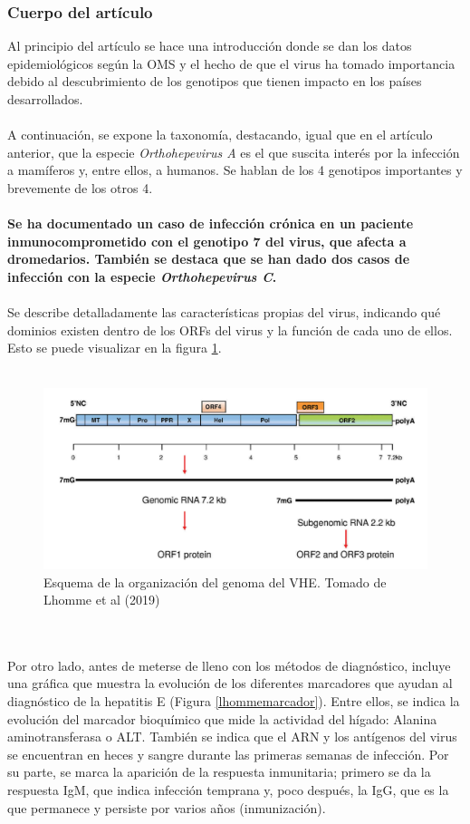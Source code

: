 \documentclass[11 pt]{article}
\begin{document}
\subsubsection{Cuerpo del artículo}
Al principio del artículo se hace una introducción donde se dan los datos epidemiológicos según la OMS y el hecho de que el virus ha tomado importancia debido al descubrimiento de los genotipos que tienen impacto en los países desarrollados.\\\\
A continuación, se expone la taxonomía, destacando, igual que en el artículo anterior, que la especie {\em Orthohepevirus A} es el que suscita interés por la infección a mamíferos y, entre ellos, a humanos. Se hablan de los 4 genotipos importantes y brevemente de los otros 4. \\\\
{\bf Se ha documentado un caso de infección crónica en un paciente inmunocomprometido con el genotipo 7 del virus, que afecta a dromedarios. También se destaca que se han dado dos casos de infección con la especie {\em Orthohepevirus C}.}\\\\
Se describe detalladamente las características propias del virus, indicando qué dominios existen dentro de los ORFs del virus y la función de cada uno de ellos. Esto se puede visualizar en la figura \ref{lhommegenoma}.\\\\
\begin{figure} [h!] 
	\centering
	\includegraphics[width=0.75\linewidth]{imagenes/genoma VHE.png}
	\caption[loftitle]{Esquema de la organización del genoma del VHE. Tomado de Lhomme et al (2019) \cite{Lhomme2019}}
	\label{lhommegenoma}
\end{figure}
\\\\Por otro lado, antes de meterse de lleno con los métodos de diagnóstico, incluye una gráfica que muestra la evolución de los diferentes marcadores que ayudan al diagnóstico de la hepatitis E (Figura \ref{lhommemarcador}). Entre ellos, se indica la evolución del marcador bioquímico que mide la actividad del hígado: Alanina aminotransferasa o ALT. También se indica que el ARN y los antígenos del virus se encuentran en heces y sangre durante las primeras semanas de infección. Por su parte, se marca la aparición de la respuesta inmunitaria; primero se da la respuesta IgM, que indica infección temprana y, poco después, la IgG, que es la que permanece y persiste por varios años (inmunización).
\end{document}

